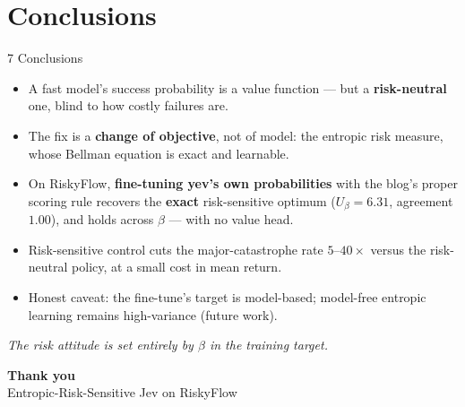 \documentclass[aspectratio=169,11pt]{beamer}
\newcommand{\Ub}{U_{\beta}}
\begin{document}
\section{Conclusions}
\begin{frame}{7 \quad Conclusions}
  \begin{itemize}
    \item A fast model's success probability is a value function --- but a \textbf{risk-neutral}
          one, blind to how costly failures are.
    \item The fix is a \textbf{change of objective}, not of model: the entropic risk measure,
          whose Bellman equation is exact and learnable.
    \item On RiskyFlow, \textbf{fine-tuning yev's own probabilities} with the blog's proper
          scoring rule recovers the \textbf{exact} risk-sensitive optimum
          ($\Ub=6.31$, agreement $1.00$), and holds across $\beta$ --- with no value head.
    \item Risk-sensitive control cuts the major-catastrophe rate $5$--$40\times$ versus the
          risk-neutral policy, at a small cost in mean return.
    \item Honest caveat: the fine-tune's target is model-based; model-free entropic learning
          remains high-variance (future work).
  \end{itemize}
  \vspace{2mm}
  \begin{center}\small
  \textit{The risk attitude is set entirely by $\beta$ in the training target.}
  \end{center}
\end{frame}

\begin{frame}[plain]
  \begin{center}
  {\Large\textbf{Thank you}}\\[2mm]
  \small Entropic-Risk-Sensitive Jev on RiskyFlow
  \end{center}
\end{frame}
\end{document}
